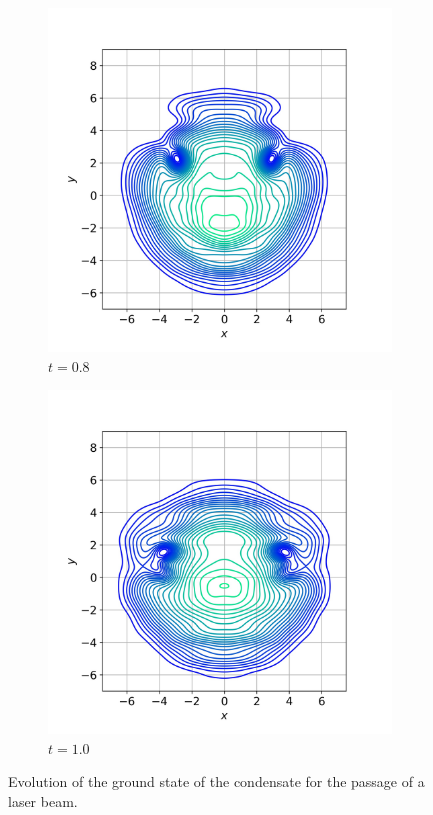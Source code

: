 \documentclass{article}
\begin{document}
\begin{figure}
\begin{subfigure}[b]{.45\linewidth}
\includegraphics[width=\linewidth]{imgs/vortex_contour/contour_vortices_80.jpeg}
\caption{$t = 0.8$}\label{fig:gull}
\end{subfigure}
\begin{subfigure}[b]{.45\linewidth}
\includegraphics[width=\linewidth]{imgs/vortex_contour/contour_vortices_100.jpeg}
\caption{$t = 1.0$}\label{fig:tiger}
\end{subfigure}

\caption{Evolution of the ground state of the condensate for the passage of a laser beam. }
\label{fig:ground-state-laser}
\end{figure}
\end{document}
